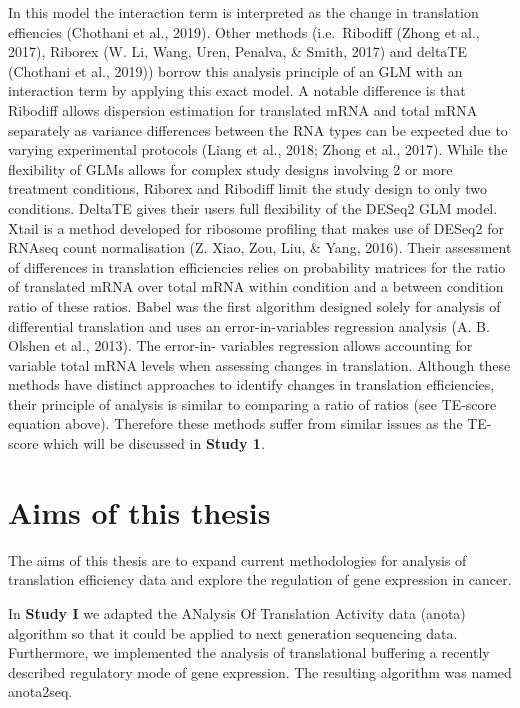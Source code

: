 \documentclass[12pt,openany]{book}
\begin{document}
In this model the interaction term is interpreted as the change in
translation effiencies (Chothani et al., 2019). Other methods
(i.e.~Ribodiff (Zhong et al., 2017), Riborex (W. Li, Wang, Uren,
Penalva, \& Smith, 2017) and deltaTE (Chothani et al., 2019)) borrow
this analysis principle of an GLM with an interaction term by applying
this exact model. A notable difference is that Ribodiff allows
dispersion estimation for translated mRNA and total mRNA separately as
variance differences between the RNA types can be expected due to
varying experimental protocols (Liang et al., 2018; Zhong et al., 2017).
While the flexibility of GLMs allows for complex study designs involving
2 or more treatment conditions, Riborex and Ribodiff limit the study
design to only two conditions. DeltaTE gives their users full
flexibility of the DESeq2 GLM model. Xtail is a method developed for
ribosome profiling that makes use of DESeq2 for RNAseq count
normalisation (Z. Xiao, Zou, Liu, \& Yang, 2016). Their assessment of
differences in translation efficiencies relies on probability matrices
for the ratio of translated mRNA over total mRNA within condition and a
between condition ratio of these ratios. Babel was the first algorithm
designed solely for analysis of differential translation and uses an
error-in-variables regression analysis (A. B. Olshen et al., 2013). The
error-in- variables regression allows accounting for variable total mRNA
levels when assessing changes in translation. Although these methods
have distinct approaches to identify changes in translation
efficiencies, their principle of analysis is similar to comparing a
ratio of ratios (see TE-score equation above). Therefore these methods
suffer from similar issues as the TE-score which will be discussed in
\textbf{Study 1}.

\chapter{Aims of this thesis}

The aims of this thesis are to expand current methodologies for analysis
of translation efficiency data and explore the regulation of gene
expression in cancer.

In \textbf{Study I} we adapted the ANalysis Of Translation Activity data
(anota) algorithm so that it could be applied to next generation
sequencing data. Furthermore, we implemented the analysis of
translational buffering a recently described regulatory mode of gene
expression. The resulting algorithm was named anota2seq.
\end{document}

